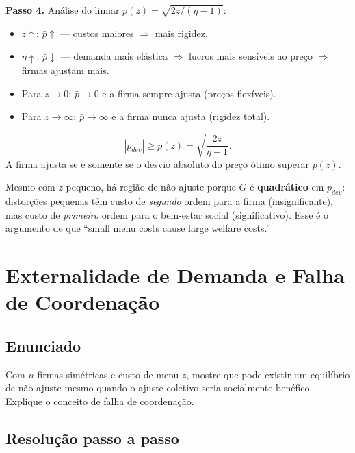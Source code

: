 \documentclass[12pt, a4paper]{article}
\begin{document}
\textbf{Passo 4.} Análise do limiar $\bar{p}(z) = \sqrt{2z/(\eta-1)}$:
\begin{itemize}[leftmargin=1.5em, itemsep=2pt]
  \item $z\uparrow$: $\bar{p}\uparrow$ --- custos maiores $\Rightarrow$ mais rigidez.
  \item $\eta\uparrow$: $\bar{p}\downarrow$ --- demanda mais elástica $\Rightarrow$
        lucros mais sensíveis ao preço $\Rightarrow$ firmas ajustam mais.
  \item Para $z\to 0$: $\bar{p}\to 0$ e a firma sempre ajusta (preços flexíveis).
  \item Para $z\to\infty$: $\bar{p}\to\infty$ e a firma nunca ajusta (rigidez total).
\end{itemize}

\begin{resultbox}[title={Limiar de ajuste de preços (Q1)}]
\[
\boxed{|p_{dev}| \geq \bar{p}(z) = \sqrt{\frac{2z}{\eta-1}}.}
\]
A firma ajusta se e somente se o desvio absoluto do preço ótimo superar $\bar{p}(z)$.
\end{resultbox}

\begin{provabox}[title={Resultado de Mankiw (1985) --- Para a Prova}]
Mesmo com $z$ pequeno, há região de não-ajuste porque $G$ é \textbf{quadrático}
em $p_{dev}$: distorções pequenas têm custo de \emph{segundo} ordem para a firma
(insignificante), mas custo de \emph{primeiro} ordem para o bem-estar social
(significativo). Esse é o argumento de que ``small menu costs cause large welfare costs.''
\end{provabox}

\section{Externalidade de Demanda e Falha de Coordenação}

\subsection*{Enunciado}
Com $n$ firmas simétricas e custo de menu $z$, mostre que pode existir um equilíbrio de
não-ajuste mesmo quando o ajuste coletivo seria socialmente benéfico. Explique o conceito
de falha de coordenação.

\subsection*{Resolução passo a passo}
\end{document}
